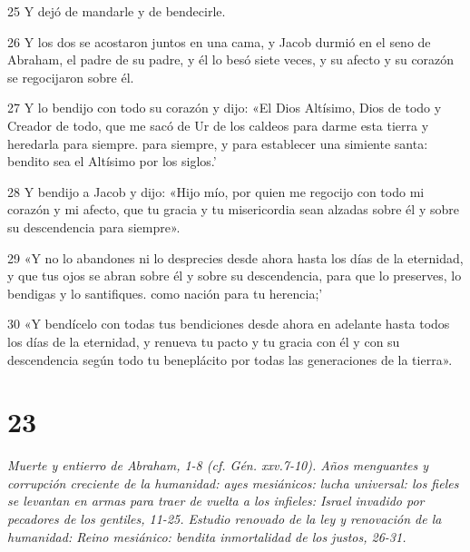 \par    
\par 25 Y dejó de mandarle y de bendecirle.
\par 26 Y los dos se acostaron juntos en una cama, y ​​Jacob durmió en el seno de Abraham, el padre de su padre, y él lo besó siete veces, y su afecto y su corazón se regocijaron sobre él.
\par 27 Y lo bendijo con todo su corazón y dijo: «El Dios Altísimo, Dios de todo y Creador de todo, que me sacó de Ur de los caldeos para darme esta tierra y heredarla para siempre. para siempre, y para establecer una simiente santa: bendito sea el Altísimo por los siglos.'
\par 28 Y bendijo a Jacob y dijo: «Hijo mío, por quien me regocijo con todo mi corazón y mi afecto, que tu gracia y tu misericordia sean alzadas sobre él y sobre su descendencia para siempre».
\par 29 «Y no lo abandones ni lo desprecies desde ahora hasta los días de la eternidad, y que tus ojos se abran sobre él y sobre su descendencia, para que lo preserves, lo bendigas y lo santifiques. como nación para tu herencia;'
\par 30 «Y bendícelo con todas tus bendiciones desde ahora en adelante hasta todos los días de la eternidad, y renueva tu pacto y tu gracia con él y con su descendencia según todo tu beneplácito por todas las generaciones de la tierra».

\chapter{23}

\par \textit{Muerte y entierro de Abraham, 1-8 (cf. Gén. xxv.7-10). Años menguantes y corrupción creciente de la humanidad: ayes mesiánicos: lucha universal: los fieles se levantan en armas para traer de vuelta a los infieles: Israel invadido por pecadores de los gentiles, 11-25. Estudio renovado de la ley y renovación de la humanidad: Reino mesiánico: bendita inmortalidad de los justos, 26-31.}

